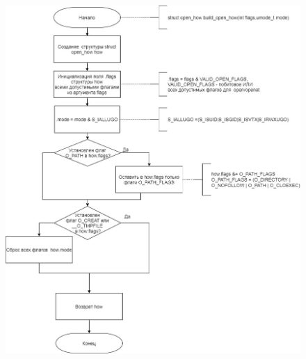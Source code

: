 \documentclass[a4paper,14pt]{extreport}
\begin{document}
\begin{figure}[H]
	\centering
	\includegraphics[scale=0.5]{img/build_open_how.jpg}
\end{figure}
\end{document}
